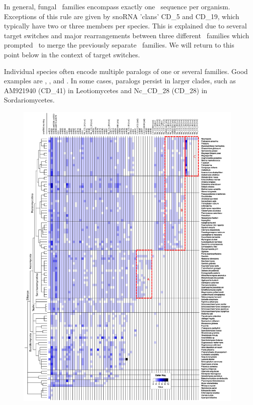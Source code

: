 In general, fungal \sno\ families encompass exactly one \sno\ sequence
per organism. Exceptions of this rule are given by snoRNA 'clans'
CD\_5 and CD\_19, which typically have two or three members per
species.  This is explained due to several target switches and major
rearrangements between three different \sno\ families which prompted
\snostrip\ to merge the previously separate \sno\ families. We will
return to this point below in the context of target switches.

Individual species often encode multiple paralogs of one or several
families. Good examples are \Ppl, \Asp, and \Nfu. In some cases,
paralogs persist in larger clades, such as AM921940 (CD\_41) in
Leotiomycetes and Nc\_CD\_28 (CD\_28) in Sordariomycetes.

\begin{figure}
  \vspace{-1cm}
  \centering
  \includegraphics[width=1.05\textwidth]{pics/CD_snoRNAs_collapsed.short_naming.rotated.eps}

\end{figure}
